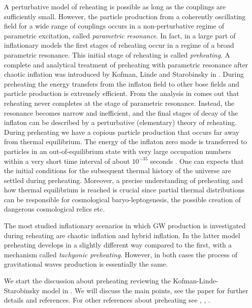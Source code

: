 \documentclass[11pt,a4paper,twoside]{book}
\begin{document}
A perturbative model of reheating is possible as long as the couplings are sufficiently small. However, the particle production from a coherently oscillating field for a wide range of couplings occurs in a non-perturbative regime of parametric excitation, called \textit{parametric resonance}. In fact, in a large part of inflationary models the first stages of reheating occur in a regime of a broad parametric resonance. This initial stage of reheating is called \textit{preheating}. A complete and analytical treatment of  preheating with parametric resonance after chaotic inflation  was introduced by Kofman, Linde and Starobinsky in \cite{Chap4:LindePreheatingModel}. During preheating the energy transfers from the inflaton field to other bose fields and particle production is extremely efficient. From the analysis in \cite{Chap4:LindePreheatingModel} comes out that reheating never completes at the stage of parametric resonance. Instead, the resonance becomes narrow and inefficient, and the final stages of  decay of the inflaton  can be described by a perturbative (elementary) theory of reheating. During preheating we have a copious particle production that occurs far away from thermal equilibrium. The energy of the inflaton zero mode is transferred to particles in an out-of-equilibrium state with very large occupation numbers within a very short time interval of about $ 10^{-35} $ seconds \cite{Chap7:Peloso_Thermalization}. One can expects that the initial conditions for the subsequent thermal history of the universe are settled during preheating. Moreover, a precise understanding of preheating and how thermal equilibrium is reached is crucial since partial thermal distributions can be responsible for cosmological baryo-leptogenesis, the possible creation of dangerous cosmological relics etc.

The most studied inflationary scenarios in which GW production is investigated during reheating are chaotic inflation and hybrid inflation. In the latter model preheating develops in a slightly different way compared to the first, with a mechanism called \textit{tachyonic preheating}. However, in both cases the process of gravitational waves production is essentially the same.

We start the discussion about preheating reviewing the Kofman-Linde-Starobinsky model in \cite{Chap4:LindePreheatingModel}. We will discuss the main points, see the paper for further details and references. For other references about preheating see \cite{Chap4:Lozanov}, \cite{Chap4:AminHetrzberg}, \cite{InflationDynamicsAndReheating:chap1}.
\end{document}
